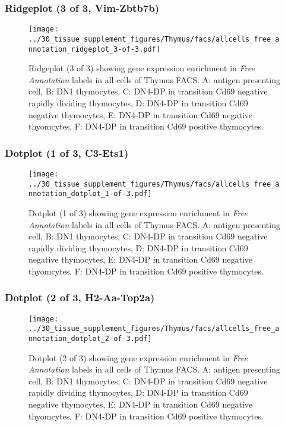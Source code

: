 \clearpage

\subsubsection{Ridgeplot (3 of 3, Vim-Zbtb7b)}
\begin{figure}[h]
\centering
\texttt{[image: ../30\_tissue\_supplement\_figures/Thymus/facs/allcells\_free\_annotation\_ridgeplot\_3-of-3.pdf]}

\caption{ Ridgeplot (3 of 3)  showing gene expression enrichment in \emph{Free Annotation} labels in all cells of Thymus FACS. A: antigen presenting cell, B: DN1 thymocytes, C: DN4-DP in transition Cd69 negative rapidly dividing thymocytes, D: DN4-DP in transition Cd69 negative thymocytes, E: DN4-DP in transition Cd69 negative thyomcytes, F: DN4-DP in transition Cd69 positive thymocytes.}
\end{figure}


\clearpage

\subsubsection{Dotplot (1 of 3, C3-Ets1)}
\begin{figure}[h]
\centering
\texttt{[image: ../30\_tissue\_supplement\_figures/Thymus/facs/allcells\_free\_annotation\_dotplot\_1-of-3.pdf]}

\caption{ Dotplot (1 of 3)  showing gene expression enrichment in \emph{Free Annotation} labels in all cells of Thymus FACS. A: antigen presenting cell, B: DN1 thymocytes, C: DN4-DP in transition Cd69 negative rapidly dividing thymocytes, D: DN4-DP in transition Cd69 negative thymocytes, E: DN4-DP in transition Cd69 negative thyomcytes, F: DN4-DP in transition Cd69 positive thymocytes.}
\end{figure}


\clearpage

\subsubsection{Dotplot (2 of 3, H2-Aa-Top2a)}
\begin{figure}[h]
\centering
\texttt{[image: ../30\_tissue\_supplement\_figures/Thymus/facs/allcells\_free\_annotation\_dotplot\_2-of-3.pdf]}

\caption{ Dotplot (2 of 3)  showing gene expression enrichment in \emph{Free Annotation} labels in all cells of Thymus FACS. A: antigen presenting cell, B: DN1 thymocytes, C: DN4-DP in transition Cd69 negative rapidly dividing thymocytes, D: DN4-DP in transition Cd69 negative thymocytes, E: DN4-DP in transition Cd69 negative thyomcytes, F: DN4-DP in transition Cd69 positive thymocytes.}
\end{figure}


